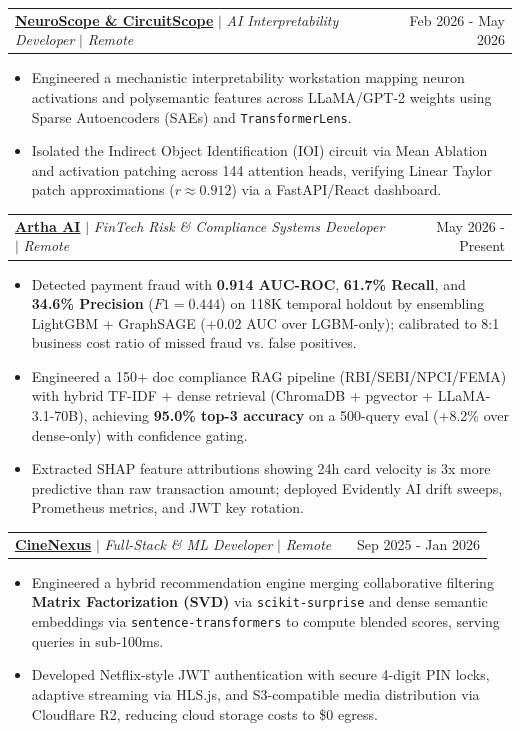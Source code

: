 \documentclass[letterpaper,9pt]{extarticle}
\makeatletter
\newcommand{\resumeItem}[1]{\item\small{{#1}}}
\newcommand{\resumeProjectHeading}[2]{
    \vspace{3pt}\item
    \begin{tabular*}{\textwidth}{l@{\extracolsep{\fill}}r}
      #1 & {\color{dark-grey}\small #2}\\
    \end{tabular*}\vspace{1.0pt}
}
\newcommand{\resumeItemListStart}{\begin{itemize}[leftmargin=*, label=\textbullet, noitemsep, topsep=0pt, parsep=0pt, partopsep=0pt]}
\newcommand{\resumeItemListEnd}{\end{itemize}}
\makeatother
\begin{document}
      \resumeProjectHeading
          {\textbf{\href{https://circuit-scope-pi.vercel.app/}{NeuroScope \& CircuitScope}} $|$ \small\textit{AI Interpretability Developer} $|$ \small\textit{Remote} ~ \href{https://github.com/Gaurav711cgu/NeuroScope-main}{\faGithub}}{Feb 2026 - May 2026}
          \resumeItemListStart
            \resumeItem{Engineered a mechanistic interpretability workstation mapping neuron activations and polysemantic features across LLaMA/GPT-2 weights using Sparse Autoencoders (SAEs) and \texttt{TransformerLens}.}
            \resumeItem{Isolated the Indirect Object Identification (IOI) circuit via Mean Ablation and activation patching across 144 attention heads, verifying Linear Taylor patch approximations ($r \approx 0.912$) via a FastAPI/React dashboard.}
          \resumeItemListEnd

      \resumeProjectHeading
          {\textbf{\href{https://huggingface.co/spaces/Gaurav711/Artha_ai}{Artha AI}} $|$ \small\textit{FinTech Risk \& Compliance Systems Developer} $|$ \small\textit{Remote} ~ \href{https://github.com/Gaurav711cgu/Aarthaa_ai}{\faGithub}}{May 2026 - Present}
          \resumeItemListStart
            \resumeItem{Detected payment fraud with \textbf{0.914 AUC-ROC}, \textbf{61.7\% Recall}, and \textbf{34.6\% Precision} ($F1=0.444$) on 118K temporal holdout by ensembling LightGBM + GraphSAGE (+0.02 AUC over LGBM-only); calibrated to 8:1 business cost ratio of missed fraud vs. false positives.}
            \resumeItem{Engineered a 150+ doc compliance RAG pipeline (RBI/SEBI/NPCI/FEMA) with hybrid TF-IDF + dense retrieval (ChromaDB + pgvector + LLaMA-3.1-70B), achieving \textbf{95.0\% top-3 accuracy} on a 500-query eval (+8.2\% over dense-only) with confidence gating.}
            \resumeItem{Extracted SHAP feature attributions showing 24h card velocity is 3x more predictive than raw transaction amount; deployed Evidently AI drift sweeps, Prometheus metrics, and JWT key rotation.}
          \resumeItemListEnd

      \resumeProjectHeading
          {\textbf{\href{https://cinenexus.vercel.app/}{CineNexus}} $|$ \small\textit{Full-Stack \& ML Developer} $|$ \small\textit{Remote} ~ \href{https://github.com/Gaurav711cgu/CineNexus}{\faGithub}}{Sep 2025 - Jan 2026}
          \resumeItemListStart
            \resumeItem{Engineered a hybrid recommendation engine merging collaborative filtering \textbf{Matrix Factorization (SVD)} via \texttt{scikit-surprise} and dense semantic embeddings via \texttt{sentence-transformers} to compute blended scores, serving queries in sub-100ms.}
            \resumeItem{Developed Netflix-style JWT authentication with secure 4-digit PIN locks, adaptive streaming via HLS.js, and S3-compatible media distribution via Cloudflare R2, reducing cloud storage costs to \$0 egress.}
          \resumeItemListEnd
\end{document}

